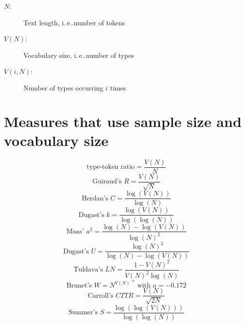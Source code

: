 \documentclass[11pt]{scrartcl}
\title{}
\author{}
\date{\today}
\makeatletter
\newcommand{\ie}{i.\,e\@ifnextchar.{}{.\@\xspace}}
\makeatother
\begin{document}
\maketitle

\begin{description}
\item[$N$:] Text length, \ie number of tokens
\item[$V(N)$:] Vocabulary size, \ie number of types
\item[$V(i, N)$:] Number of types occurring $i$ times
\end{description}

\section{Measures that use sample size and vocabulary size}

\[\text{type-token ratio} = \frac{V(N)}{N}\]
\[\text{Guiraud's } R = \frac{V(N)}{\sqrt{N}}\]
\[\text{Herdan's } C = \frac{\log(V(N))}{\log(N)}\]
\[\text{Dugast's } k = \frac{\log(V(N))}{\log(\log(N))}\]
\[\text{Maas' } a^2 = \frac{\log(N) - \log(V(N))}{\log(N)^2}\]
\[\text{Dugast's } U = \frac{\log(N)^2}{\log(N) - \log(V(N))}\]
\[\text{Tuldava's } \textit{LN} = \frac{1 - V(N)^2}{V(N)^2\log(N)}\]
\[\text{Brunet's } W = N^{V(N)^{-a}} \text{ with } a = -0.172\]
\[\text{Carroll's } \textit{CTTR} = \frac{V(N)}{\sqrt{2 N}}\]
\[\text{Summer's } S = \frac{\log(\log(V(N)))}{\log(\log(N))}\]
\end{document}
